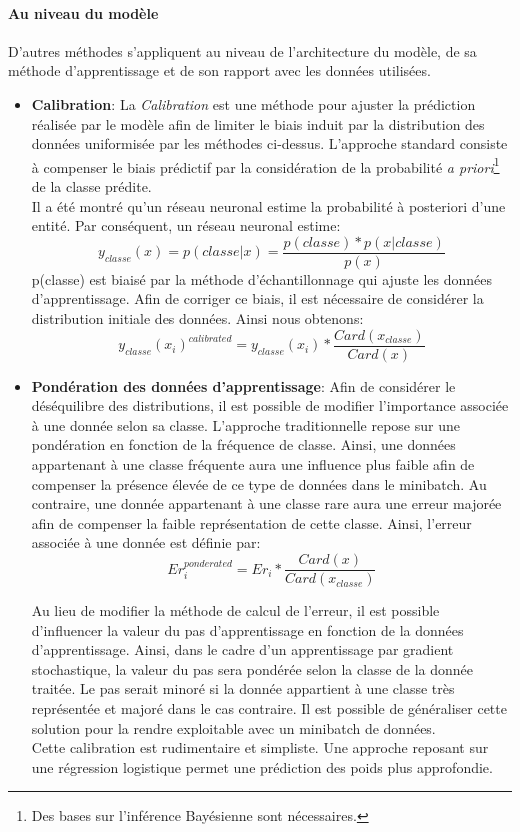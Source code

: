 \paragraph{Au niveau du modèle}
D'autres méthodes s'appliquent au niveau de l'architecture du modèle, de sa méthode d'apprentissage et de son rapport avec les données utilisées.

\begin{itemize}
    \item \textbf{Calibration}: La \textit{Calibration} est une méthode pour ajuster la prédiction réalisée par le modèle afin de limiter le biais induit par la distribution des données uniformisée par les méthodes ci-dessus. L'approche standard consiste à compenser le biais prédictif par la considération de la probabilité \textit{a priori}\footnote{Des bases sur l'inférence Bayésienne sont nécessaires.} de la classe prédite. \\

    Il a été montré qu'un réseau neuronal estime la probabilité à posteriori d'une entité. Par conséquent, un réseau neuronal estime:
    $$y_{classe}(x) = p(classe|x) = \frac{p(classe)*p(x|classe)}{p(x)}$$
    p(classe) est biaisé par la méthode d'échantillonnage qui ajuste les données d'apprentissage. Afin de corriger ce biais, il est nécessaire de considérer la distribution initiale des données. Ainsi nous obtenons:
    $$y_{classe}(x_i)^{calibrated} = y_{classe}(x_i) * \frac{Card(x_{classe})}{Card(x)}$$

    \item \textbf{Pondération des données d'apprentissage}: Afin de considérer le déséquilibre des distributions, il est possible de modifier l'importance associée à une donnée selon sa classe. L'approche traditionnelle repose sur une pondération en fonction de la fréquence de classe. Ainsi, une données appartenant à une classe fréquente aura une influence plus faible afin de compenser la présence élevée de ce type de données dans le minibatch. Au contraire, une donnée appartenant à une classe rare aura une erreur majorée afin de compenser la faible représentation de cette classe. Ainsi, l'erreur associée à une donnée est définie par: $$Er_i^{ponderated}=Er_i*\frac{Card(x)}{Card(x_{classe})}$$

    Au lieu de modifier la méthode de calcul de l'erreur, il est possible d'influencer la valeur du pas d'apprentissage en fonction de la données d'apprentissage. Ainsi, dans le cadre d'un apprentissage par gradient stochastique, la valeur du pas sera pondérée selon la classe de la donnée traitée. Le pas serait minoré si la donnée appartient à une classe très représentée et majoré dans le cas contraire. Il est possible de généraliser cette solution pour la rendre exploitable avec un minibatch de données.\\

    Cette calibration est rudimentaire et simpliste. Une approche reposant sur une régression logistique\cite{logis} permet une prédiction des poids plus approfondie.
\end{itemize}

